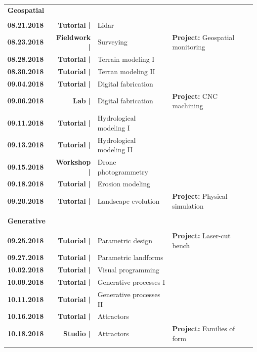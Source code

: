 \documentclass[11pt,article,oneside]{memoir}
\begin{document}
\begin{table}[H]
\begin{tabular}{l r @{\hskip 0.1cm} l @{\hskip 0.5cm} l}
\\
\normalsize
\textbf{Geospatial}\\
\small
\\
\textbf{08.21.2018} & \textbf{Tutorial |} & Lidar \\
\textbf{08.23.2018} & \textbf{Fieldwork |} & Surveying & \textbf{Project:} Geospatial monitoring \\
%
\textbf{08.28.2018} & \textbf{Tutorial |} & Terrain modeling I \\
\textbf{08.30.2018} & \textbf{Tutorial |} & Terran modeling  II \\
%
\textbf{09.04.2018} & \textbf{Tutorial |} & Digital fabrication \\
\textbf{09.06.2018} & \textbf{Lab |} & Digital fabrication & \textbf{Project:} CNC machining\\
%
\textbf{09.11.2018} & \textbf{Tutorial |} & Hydrological modeling I \\
\textbf{09.13.2018} & \textbf{Tutorial |} & Hydrological modeling II \\
\textbf{09.15.2018} & \textbf{Workshop |} & Drone photogrammetry \\
%
\textbf{09.18.2018} & \textbf{Tutorial |} & Erosion modeling \\
\textbf{09.20.2018} & \textbf{Tutorial |} & Landscape evolution & \textbf{Project:} Physical simulation \\
\\
\normalsize
\textbf{Generative}\\
\small
\\
\textbf{09.25.2018} & \textbf{Tutorial |} & Parametric design & \textbf{Project:} Laser-cut bench \\
\textbf{09.27.2018} & \textbf{Tutorial |} & Parametric landforms \\
%
\textbf{10.02.2018} & \textbf{Tutorial |} & Visual programming\\
%
\textbf{10.09.2018} & \textbf{Tutorial |} & Generative processes I \\
\textbf{10.11.2018} & \textbf{Tutorial |} & Generative processes II \\ 
%
\textbf{10.16.2018} & \textbf{Tutorial |} & Attractors \\
\textbf{10.18.2018} & \textbf{Studio |} & Attractors & \textbf{Project:} Families of form \\
\\

\end{tabular}
\end{table}
\end{document}
